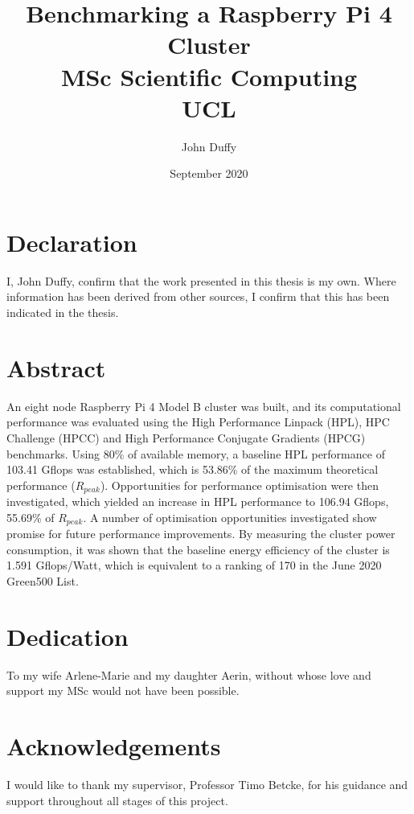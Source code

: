 \documentclass{report}
\title{Benchmarking a Raspberry Pi 4 Cluster\\MSc Scientific Computing\\UCL}
\author{John Duffy}
\date{September 2020}
\begin{document}
%
%
\maketitle
%


%
% 
\chapter*{Declaration}
I, John Duffy, confirm that the work presented in this thesis is my own. Where information has been derived from other sources, I confirm that this has been indicated in the thesis.

%
%
\chapter*{Abstract}
%
An eight node Raspberry Pi 4 Model B cluster was built, and its computational performance was evaluated using the High Performance Linpack (HPL), HPC Challenge (HPCC) and High Performance Conjugate Gradients (HPCG) benchmarks. Using 80\% of available memory, a baseline HPL performance of 103.41 Gflops was established, which is 53.86\% of the maximum theoretical performance ($R_{peak}$). Opportunities for performance optimisation were then investigated, which yielded an increase in HPL performance to 106.94 Gflops, 55.69\% of $R_{peak}$. A number of optimisation opportunities investigated show promise for future performance improvements. By measuring the cluster power consumption, it was shown that the baseline energy efficiency of the cluster is 1.591 Gflops/Watt, which is equivalent to a ranking of 170 in the June 2020 Green500 List.


%
%
\chapter*{Dedication}
To my wife Arlene-Marie and my daughter Aerin, without whose love and support my MSc would not have been possible. 


%
%
\chapter*{Acknowledgements}
I would like to thank my supervisor, Professor Timo Betcke, for his guidance and support throughout all stages of this project. 


%
%
\tableofcontents
\end{document}

